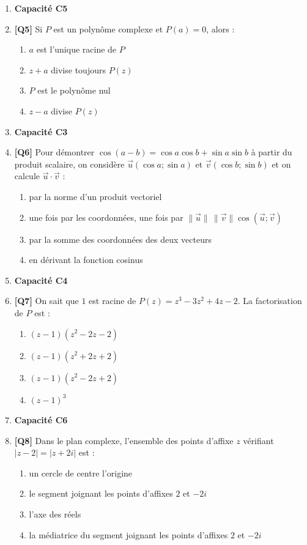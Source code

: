 \begin{enumerate}
\item[] \textbf{Capacité C5}

\item \textbf{[Q5]} Si $P$ est un polynôme complexe et $P(a)=0$, alors :
  \begin{enumerate}[label=\Alph*.]
    \item $a$ est l'unique racine de $P$
    \item $z+a$ divise toujours $P(z)$
    \item $P$ est le polynôme nul
    \item $z-a$ divise $P(z)$
  \end{enumerate}

\item[] \textbf{Capacité C3}

\item \textbf{[Q6]} Pour démontrer $\cos(a-b)=\cos a\cos b+\sin a\sin b$ à partir du produit scalaire, on considère $\vec u(\cos a;\sin a)$ et $\vec v(\cos b;\sin b)$ et on calcule $\vec u\cdot\vec v$ :
  \begin{enumerate}[label=\Alph*.]
    \item par la norme d'un produit vectoriel
    \item une fois par les coordonnées, une fois par $\|\vec u\|\,\|\vec v\|\cos(\vec u;\vec v)$
    \item par la somme des coordonnées des deux vecteurs
    \item en dérivant la fonction cosinus
  \end{enumerate}

\item[] \textbf{Capacité C4}

\item \textbf{[Q7]} On sait que $1$ est racine de $P(z)=z^3-3z^2+4z-2$. La factorisation de $P$ est :
  \begin{enumerate}[label=\Alph*.]
    \item $(z-1)(z^2-2z-2)$
    \item $(z-1)(z^2+2z+2)$
    \item $(z-1)(z^2-2z+2)$
    \item $(z-1)^3$
  \end{enumerate}

\item[] \textbf{Capacité C6}

\item \textbf{[Q8]} Dans le plan complexe, l'ensemble des points d'affixe $z$ vérifiant $|z-2|=|z+2i|$ est :
  \begin{enumerate}[label=\Alph*.]
    \item un cercle de centre l'origine
    \item le segment joignant les points d'affixes $2$ et $-2i$
    \item l'axe des réels
    \item la médiatrice du segment joignant les points d'affixes $2$ et $-2i$
  \end{enumerate}

\end{enumerate}

